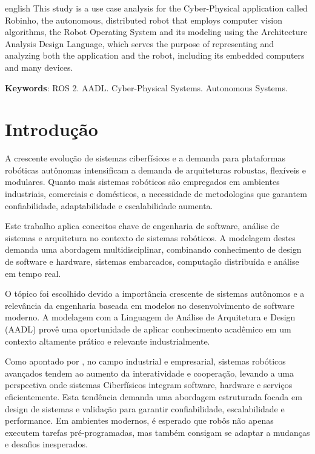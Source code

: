\documentclass[
    12pt, 
    a4paper, 
    chapter=TITLE,		%
    section=TITLE,		%
    oneside,            %
    english
]{abntex2}
\begin{document}
\begin{resumo}[Abstract]
\begin{otherlanguage*}{english}
This study is a use case analysis for the Cyber-Physical application called Robinho, the autonomous, distributed robot that employs computer vision algorithms, the Robot Operating System and its modeling using the Architecture Analysis Design Language, which serves the purpose of representing and analyzing both the application and the robot, including its embedded computers and many devices.

\textbf{Keywords}: ROS 2. AADL. Cyber-Physical Systems. Autonomous Systems.
\end{otherlanguage*}
\end{resumo}

\tableofcontents



\mainmatter  %
\setcounter{page}{1}

\chapter{Introdução}
A crescente evolução de sistemas ciberfísicos e a demanda para plataformas robóticas autônomas intensificam a demanda de arquiteturas robustas, flexíveis e modulares. Quanto mais sistemas robóticos são empregados em ambientes industriais, comerciais e domésticos, a necessidade de metodologias que garantem confiabilidade, adaptabilidade e escalabilidade aumenta.

Este trabalho aplica conceitos chave de engenharia de software, análise de sistemas e arquitetura no contexto de sistemas robóticos. A modelagem destes demanda uma abordagem multidisciplinar, combinando conhecimento de design de software e hardware, sistemas embarcados, computação distribuída e análise em tempo real.

O tópico foi escolhido devido a importância crescente de sistemas autônomos e a relevância da engenharia baseada em modelos no desenvolvimento de software moderno. A modelagem com a Linguagem de Análise de Arquitetura e Design (AADL) provê uma oportunidade de aplicar conhecimento acadêmico em um contexto altamente prático e relevante industrialmente.

Como apontado por \cite{Mikusz2014}, no campo industrial e empresarial, sistemas robóticos avançados tendem ao aumento da interatividade e cooperação, levando a uma perspectiva onde sistemas Ciberfísicos integram software, hardware e serviços eficientemente. Esta tendência demanda uma abordagem estruturada focada em design de sistemas e validação para garantir confiabilidade, escalabilidade e performance. Em ambientes modernos, é esperado que robôs não apenas executem tarefas pré-programadas, mas também consigam se adaptar a mudanças e desafios inesperados.
\end{document}

